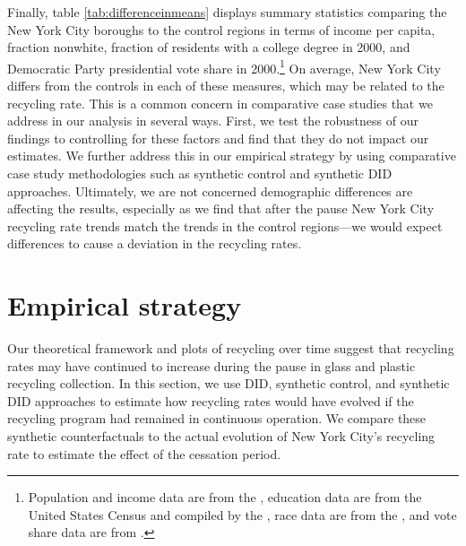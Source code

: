 \documentclass[12pt]{article}
\begin{document}
Finally, table \ref{tab:differenceinmeans} displays summary statistics comparing the New York City boroughs to the control regions in terms of income per capita, fraction nonwhite, fraction of residents with a college degree in 2000, and Democratic Party presidential vote share in 2000.\footnote{Population and income data are from the \cite{datacainc}, education data are from the United States Census and compiled by the \cite{dataeducation}, race data are from the \cite{datarace}, and vote share data are from \cite{datavoteshare}.}  On average, New York City differs from the controls in each of these measures, which may be related to the recycling rate.  This is a common concern in comparative case studies that we address in our analysis in several ways.  First, we test the robustness of our findings to controlling for these factors and find that they do not impact our estimates.  We further address this in our empirical strategy by using comparative case study methodologies such as synthetic control and synthetic DID approaches.  Ultimately, we are not concerned demographic differences are affecting the results, especially as we find that after the pause New York City recycling rate trends match the trends in the control regions---we would expect differences to cause a deviation in the recycling rates.

\section{Empirical strategy}

Our theoretical framework and plots of recycling over time suggest that recycling rates may have continued to increase during the pause in glass and plastic recycling collection.  In this section, we use DID, synthetic control, and synthetic DID approaches to estimate how recycling rates would have evolved if the recycling program had remained in continuous operation. We compare these synthetic counterfactuals to the actual evolution of New York City's recycling rate to estimate the effect of the cessation period.
\end{document}
